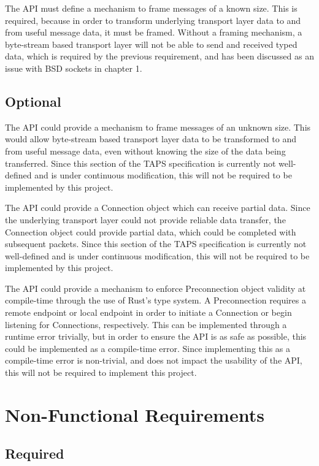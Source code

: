 \documentclass{l4proj}
\begin{document}
The API must define a mechanism to frame messages of a known size.
This is required, because in order to transform underlying transport layer data to and from useful message data,
it must be framed.
Without a framing mechanism, a byte-stream based transport layer will not be able to send and received typed data,
which is required by the previous requirement, and has been discussed as an issue with BSD sockets in chapter 1.

\subsection{Optional}

The API could provide a mechanism to frame messages of an unknown size.
This would allow byte-stream based transport layer data to be transformed to and from useful message data, even without
knowing the size of the data being transferred.
Since this section of the TAPS specification is currently not well-defined and is under continuous modification,
this will not be required to be implemented by this project.

The API could provide a Connection object which can receive partial data.
Since the underlying transport layer could not provide reliable data transfer, the Connection object could provide
partial data, which could be completed with subsequent packets.
Since this section of the TAPS specification is currently not well-defined and is under continuous modification, this
will not be required to be implemented by this project.

The API could provide a mechanism to enforce Preconnection object validity at compile-time through the use of Rust's
type system.
A Preconnection requires a remote endpoint or local endpoint in order to initiate a Connection or begin listening for
Connections, respectively.
This can be implemented through a runtime error trivially, but in order to ensure the API is as safe as possible, this
could be implemented as a compile-time error.
Since implementing this as a compile-time error is non-trivial, and does not impact the usability of the API, this will
not be required to implement this project.

\section{Non-Functional Requirements}

\subsection{Required}
\end{document}
